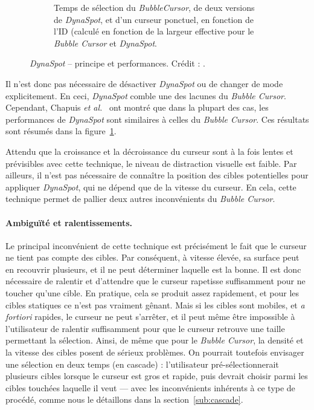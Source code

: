 \begin{figure}[htbp]
\begin{subfigure}[t]{0.44\textwidth}
			\caption{Temps de sélection du \emph{BubbleCursor}, de deux versions de \emph{DynaSpot}, et d'un curseur ponctuel, en fonction de l'ID (calculé en fonction de la largeur effective pour le \emph{Bubble Cursor} et \emph{DynaSpot}.}
			\label{fig:dynaResults}
		\end{subfigure}
		\caption[\emph{DynaSpot} -- principe et performances]{\emph{DynaSpot} -- principe et performances. Crédit : \cite{chapuis2009dynaspot}.}
		\label{fig:dynaSpotRes}
	\end{figure}
	
	Il n'est donc pas nécessaire de désactiver \emph{DynaSpot} ou de changer de mode explicitement. En ceci, \emph{DynaSpot} comble une des lacunes du \emph{Bubble Cursor}. Cependant, Chapuis \emph{et al.}~\cite{chapuis2009dynaspot} ont montré que dans la plupart des cas, les performances de \emph{DynaSpot} sont similaires à celles du \emph{Bubble Cursor}. Ces résultats sont résumés dans la figure~\ref{fig:dynaResults}.

	Attendu que la croissance et la décroissance du curseur sont à la fois lentes et prévisibles avec cette technique, le niveau de distraction visuelle est faible. Par ailleurs, il n'est pas nécessaire de connaître la position des cibles potentielles pour appliquer \emph{DynaSpot}, qui ne dépend que de la vitesse du curseur. En cela, cette technique permet de pallier deux autres inconvénients du \emph{Bubble Cursor}.

	\paragraph{Ambiguïté et ralentissements.}
	Le principal inconvénient de cette technique est précisément le fait que le curseur ne tient pas compte des cibles. Par conséquent, à vitesse élevée, sa surface peut en recouvrir plusieurs, et il ne peut déterminer laquelle est la bonne. Il est donc nécessaire de ralentir et d'attendre que le curseur rapetisse suffisamment pour ne toucher qu'une cible. En pratique, cela se produit assez rapidement, et pour les cibles statiques ce n'est pas vraiment gênant. Mais si les cibles sont mobiles, et \emph{a fortiori} rapides, le curseur ne peut s'arrêter, et il peut même être impossible à l'utilisateur de ralentir suffisamment pour que le curseur retrouve une taille permettant la sélection. Ainsi, de même que pour le \emph{Bubble Cursor}, la densité et la vitesse des cibles posent de sérieux problèmes. On pourrait toutefois envisager une sélection en deux temps (en cascade) : l'utilisateur pré-sélectionnerait plusieurs cibles lorsque le curseur est gros et rapide, puis devrait choisir parmi les cibles touchées laquelle il veut --- avec les inconvénients inhérents à ce type de procédé, comme nous le détaillons dans la section~\ref{sub:cascade}.
	
